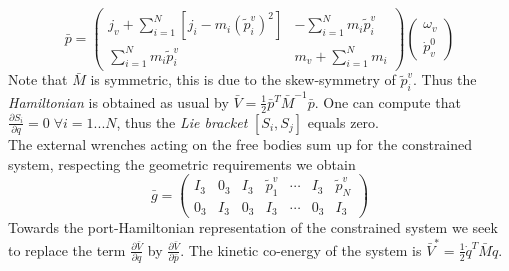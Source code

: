 \documentclass[a4paper,twoside, openright,12pt]{report}
\begin{document}
\[\bar{p} = \begin{pmatrix}
j_v+\sum_{i=1}^N [j_i - m_i(\tilde{p}_i^v)^2] & -\sum_{i=1}^N m_i\tilde{p}_i^v \\ \sum_{i=1}^N m_i\tilde{p}_i^v & m_v + \sum_{i=1}^N m_i
\end{pmatrix}  \begin{pmatrix}
\omega_v \\ \dot{p}_v^0
\end{pmatrix} \]
Note that $\bar{M}$ is symmetric, this is due to the skew-symmetry of $ \tilde{p}_i^v $.
Thus the \emph{Hamiltonian} is obtained as usual by $\bar{V} =  \frac{1}{2}\bar{p}^T\bar{M}^{-1}\bar{p}$.
One can compute that $\frac{\partial S_i}{\partial q} = 0 \; \forall i=1...N$, thus the \emph{Lie bracket} $[S_i,S_j]$ equals zero.\\
The external wrenches acting on the free bodies sum up for the constrained system, respecting the geometric requirements we obtain
\[ \bar{g} = \begin{pmatrix}
I_3 & 0_3 & I_3 & \tilde{p}_1^v & \cdots & I_3 & \tilde{p}_N^v \\0_3 & I_3 & 0_3 & I_3 & \cdots & 0_3 & I_3
\end{pmatrix} \]
Towards the port-Hamiltonian representation of the constrained system we seek to replace the term $ \frac{\partial \bar{V}}{\partial q} $ by $ \frac{\partial \bar{V}}{\partial \bar{p}} $. The kinetic co-energy of the system is $\bar{V}^* =\frac{1}{2} \dot{q}^T \bar{M} \dot{q}$.
\end{document}
